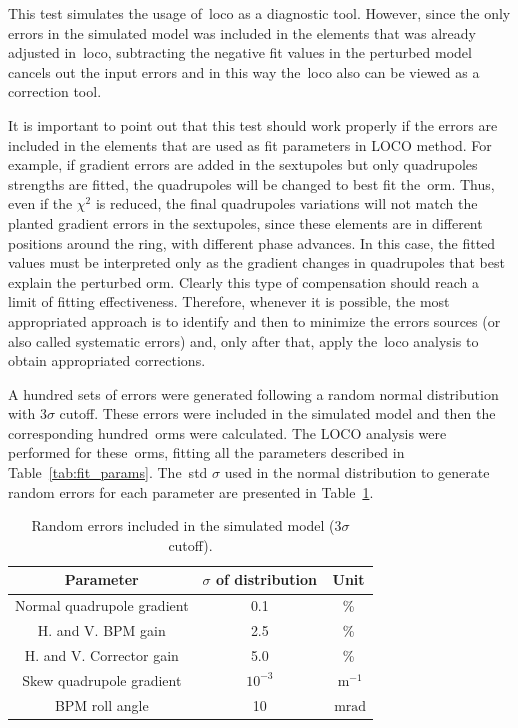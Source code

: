 This test simulates the usage of~\gls{loco} as a diagnostic tool. However, since the only errors in the simulated model was included in the elements that was already adjusted in~\gls{loco}, subtracting the negative fit values in the perturbed model cancels out the input errors and in this way the~\gls{loco} also can be viewed as a correction tool.

It is important to point out that this test should work properly if the errors are included in the elements that are used as fit parameters in LOCO method. For example, if gradient errors are added in the sextupoles but only quadrupoles strengths are fitted, the quadrupoles will be changed to best fit the~\gls{orm}. Thus, even if the $\chi^2$ is reduced, the final quadrupoles variations will not match the planted gradient errors in the sextupoles, since these elements are in different positions around the ring, with different phase advances. In this case, the fitted values must be interpreted only as the gradient changes in quadrupoles that best explain the perturbed \gls{orm}. Clearly this type of compensation should reach a limit of fitting effectiveness. Therefore, whenever it is possible, the most appropriated approach is to identify and then to minimize the errors sources (or also called systematic errors) and, only after that, apply the~\gls{loco} analysis to obtain appropriated corrections.

A hundred sets of errors were generated following a random normal distribution with $3\sigma$ cutoff. These errors were included in the simulated model and then the corresponding hundred~\gls{orm}s were calculated. The LOCO analysis were performed for these~\gls{orm}s, fitting all the parameters described in Table~\ref{tab:fit_params}. The~\gls{std} $\sigma$ used in the normal distribution to generate random errors for each parameter are presented in Table~\ref{tab:errors}.
\begin{table}[h!]
    \centering
    \caption{Random errors included in the simulated model ($3\sigma$ cutoff).}
    \label{tab:errors}
    \begin{tabular}{ccc}
        \toprule\toprule
        Parameter & $\sigma$ of distribution & Unit\\ 
        \hline
        Normal quadrupole gradient & 0.1 &\% \\
        H. and V. BPM gain &  2.5 & \% \\
        H. and V. Corrector gain & 5.0 &\% \\
        Skew quadrupole gradient & $10^{-3}$ &$\SI{}{\meter^{-1}}$ \\
        BPM roll angle & 10 & $\SI{}{\milli\radian}$ \\ 
        \bottomrule\bottomrule
    \end{tabular}
\end{table}

